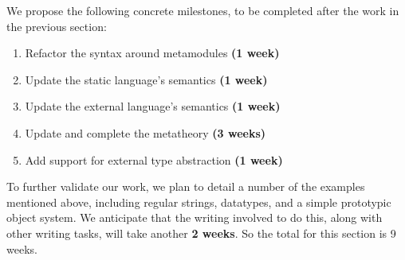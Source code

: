 We propose the following concrete milestones, to be completed after the work in the previous section:
\begin{enumerate}
\item Refactor the syntax around metamodules \textbf{(1 week)}
\item Update the static language's semantics \textbf{(1 week)}
\item Update the external language's semantics \textbf{(1 week)}
\item Update and complete the metatheory \textbf{(3 weeks)}
\item Add support for external type abstraction \textbf{(1 week)}
\end{enumerate}

To further validate our work, we plan to detail a number of the examples mentioned above, including regular strings, datatypes, and a simple prototypic object system. We anticipate that the writing involved to do this, along with other writing tasks, will take another \textbf{2 weeks}. So the total for this section is 9 weeks.

